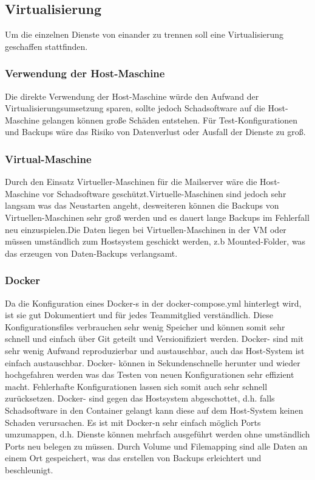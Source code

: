 \documentclass[a4paper,11pt,singlespacing]{article}
\begin{document}
	\subsection{Virtualisierung}\label{sec:Virtualisierung}
		Um die einzelnen Dienste von einander zu trennen soll eine Virtualisierung geschaffen stattfinden.

		\subsubsection{Verwendung der Host-Maschine}\label{Verwendung der Host-Maschine}
			Die direkte Verwendung der Host-Maschine würde den Aufwand der Virtualisierungsumsetzung sparen, sollte jedoch Schadsoftware auf die Host-Maschine gelangen können große Schäden entstehen. Für Test-Konfigurationen und Backups wäre das Risiko von Datenverlust oder Ausfall der Dienste zu groß.

		\subsubsection{Virtual-Maschine}\label{Virtual-Maschine}
			Durch den Einsatz Virtueller-Maschinen für die Mailserver wäre die Host-Maschine vor Schadsoftware geschützt.Virtuelle-Maschinen sind jedoch sehr langsam was das Neustarten angeht, desweiteren können die Backups von Virtuellen-Maschinen sehr groß werden und es dauert lange Backups im Fehlerfall neu einzuspielen.Die Daten liegen bei Virtuellen-Maschinen in der VM oder müssen umständlich zum Hostsystem geschickt werden, z.b Mounted-Folder, was das erzeugen von Daten-Backups verlangsamt.

		\subsubsection{Docker}\label{Docker}
			Da die Konfiguration eines  Docker-s in der docker-compose.yml hinterlegt wird, ist sie gut Dokumentiert und für jedes Teammitglied verständlich. Diese Konfigurationsfiles verbrauchen sehr wenig Speicher und können somit sehr schnell und einfach über Git geteilt und Versionifiziert werden. Docker- sind mit sehr wenig Aufwand reproduzierbar und austauschbar, auch das Host-System ist einfach austauschbar. Docker- können in Sekundenschnelle herunter und wieder hochgefahren werden was das Testen von neuen Konfigurationen sehr effizient macht. Fehlerhafte Konfigurationen lassen sich somit auch sehr schnell zurücksetzen. Docker- sind gegen das Hostsystem abgeschottet, d.h. falls Schadsoftware in den Container gelangt kann diese auf dem Host-System keinen Schaden verursachen. Es ist mit Docker-n sehr einfach möglich Ports umzumappen, d.h. Dienste können mehrfach ausgeführt werden ohne umständlich Ports neu belegen zu müssen. 	Durch Volume und Filemapping sind alle Daten an einem Ort gespeichert, was das erstellen von Backups erleichtert und beschleunigt.
\end{document}
